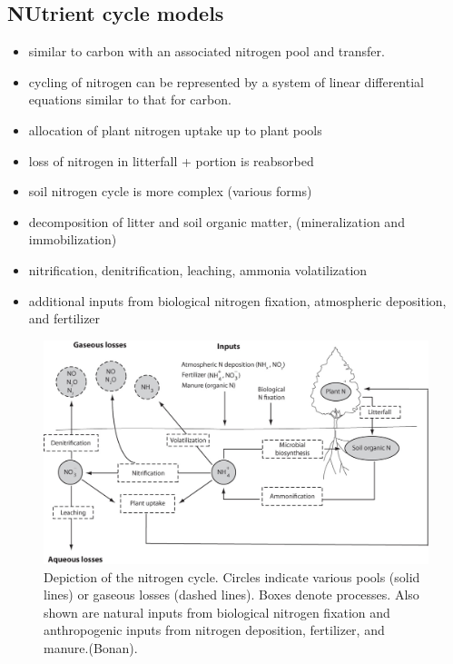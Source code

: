 \documentclass[12pt,oneside]{book}
\begin{document}
\subsection{NUtrient cycle models}\label{nutrient-cycle-models}

\begin{itemize}
\item
  similar to carbon with an associated nitrogen pool and transfer.
\item
  cycling of nitrogen can be represented by a system of linear
  differential equations similar to that for carbon.
\item
  allocation of plant nitrogen uptake up to plant pools
\item
  loss of nitrogen in litterfall + portion is reabsorbed
\item
  soil nitrogen cycle is more complex (various forms)
\item
  decomposition of litter and soil organic matter, (mineralization and
  immobilization)
\item
  nitrification, denitrification, leaching, ammonia volatilization
\item
  additional inputs from biological nitrogen fixation, atmospheric
  deposition, and fertilizer
\end{itemize}

\begin{figure}

{\centering \includegraphics[width=0.8\linewidth]{figures/chap5/f519_N_cycle} 

}

\caption{Depiction of the nitrogen cycle. Circles indicate various pools (solid lines) or gaseous losses (dashed lines). Boxes denote processes. Also shown are natural inputs from biological nitrogen fixation and anthropogenic inputs from nitrogen deposition, fertilizer, and manure.(Bonan).}\label{fig:f519}
\end{figure}
\end{document}
